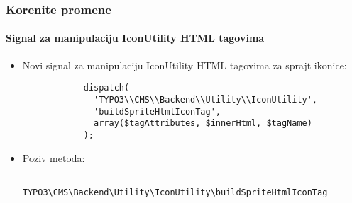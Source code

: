 \begin{frame}[fragile]
	\frametitle{Korenite promene}
	\framesubtitle{Signal za manipulaciju IconUtility HTML tagovima}

	\lstset{
		basicstyle=\tiny\ttfamily
	}

	\begin{itemize}

		\item Novi signal za manipulaciju IconUtility HTML tagovima za sprajt ikonice:

		\begin{lstlisting}
			dispatch(
			  'TYPO3\\CMS\\Backend\\Utility\\IconUtility',
			  'buildSpriteHtmlIconTag',
			  array($tagAttributes, $innerHtml, $tagName)
			);
		\end{lstlisting}

		\item Poziv metoda:

		\begin{lstlisting}
			TYPO3\CMS\Backend\Utility\IconUtility\buildSpriteHtmlIconTag
		\end{lstlisting}

	\end{itemize}

\end{frame}


